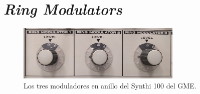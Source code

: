 \section[Output Channels]{\textit{Ring Modulators}}
\label{sec:ring_modulators}


\begin{figure}
	\centering
	\includegraphics[width=0.7\textwidth]{images/ring_modulators}
	\caption[\textit{Ring Modulators}]{Los tres moduladores en anillo del Synthi 100 del GME.}
	\label{fig:echo}
\end{figure}